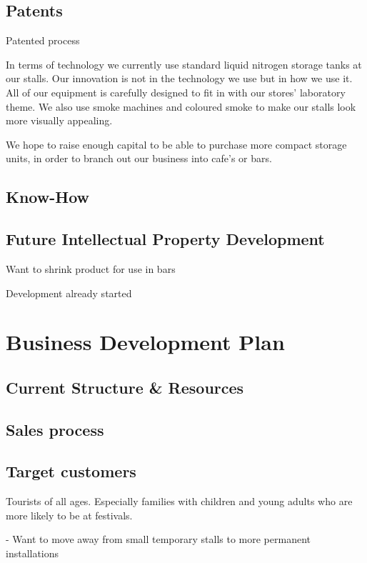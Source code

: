 \documentclass{article}
\begin{document}
  \subsection{Patents}
    Patented process

In terms of technology we currently use standard liquid nitrogen storage tanks at our stalls. Our innovation is not in the technology we use but in how we use it. All of our equipment is carefully designed to fit in with our stores' laboratory theme. We also use smoke machines and coloured smoke to make our stalls look more visually appealing.

We hope to raise enough capital to be able to purchase more compact storage units, in order to branch out our business into cafe's or bars.

  \subsection{Know-How}

  \subsection{Future Intellectual Property Development}

  Want to shrink product for use in bars

  Development already started

\section{Business Development Plan}

  \subsection{Current Structure \& Resources}

  \subsection{Sales process}

  \subsection{Target customers}
Tourists of all ages. Especially families with children and young adults
who are more likely to be at festivals.

 - Want to move away from small temporary stalls to more permanent
installations
\end{document}
